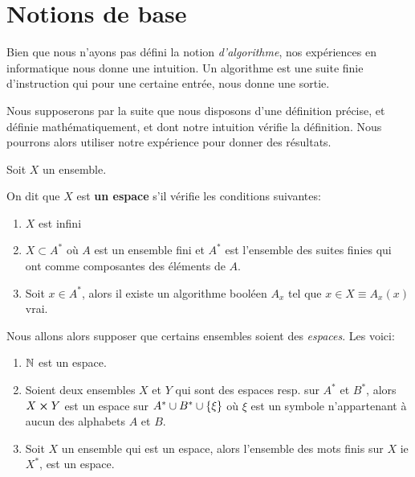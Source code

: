 
\section{Notions de base}

Bien que nous n'ayons pas défini la notion \textit{d'algorithme}, nos
expériences en informatique nous donne une intuition. Un algorithme est une
suite finie d'instruction qui pour une certaine entrée, nous donne une sortie.

Nous supposerons par la suite que nous disposons d'une définition précise, et
définie mathématiquement, et dont notre intuition vérifie la définition.
Nous pourrons alors utiliser notre expérience pour donner des résultats.

\begin{definition}
	Soit $X$ un ensemble.

	On dit que $X$ est \textbf{un espace} s'il vérifie les conditions suivantes:

	\begin{enumerate}
		\item $X$ est infini
		\item $X \subset A^{*}$ où $A$ est un ensemble fini et $A^{*}$ est
			l'ensemble des suites finies qui ont comme composantes des éléments
			de $A$.
		\item Soit $x \in A^{*}$, alors il existe un algorithme booléen $A_{x}$ tel que
			$x \in X \equiv A_{x}(x)$ vrai.
	\end{enumerate}
\end{definition}

Nous allons alors supposer que certains ensembles soient des \textit{espaces}.
Les voici:

\begin{enumerate}
	\item $\mathbb{N}$ est un espace.
	\item Soient deux ensembles $X$ et $Y$ qui sont des espaces resp. sur $A^{*}
		$ et $B^{*}$, alors $X \cross Y$ est un espace sur $A^{*} \cup
		B^{*} \cup \left\{ \xi \right\}$ où $\xi$ est un symbole n'appartenant à
		aucun des alphabets $A$ et $B$.
	\item Soit $X$ un ensemble qui est un espace, alors l'ensemble des mots
		finis sur $X$ ie $X^{*}$, est un espace.
\end{enumerate}

